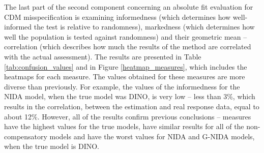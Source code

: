 \documentclass[english]{pwr_wmat_praca_dyplomowa}
\theoremstyle{plain}
\theoremstyle{definition}
\numberwithin{theorem}{chapter}
\begin{document}
The last part of the second component concerning an absolute ﬁt evaluation for CDM misspecification is examining informedness (which determines how well-informed the test is relative to randomness), markedness (which determines how well the population is tested against randomness) and their geometric mean -- correlation (which describes how much the results of the method are correlated with the actual assessment). The results are presented in Table \ref{tab:confusion_values} and in Figure \ref{heatmap_measures}, which includes the heatmaps for each measure. The values obtained for these measures are more diverse than previously. For example, the values of the informedness for the NIDA model, when the true model was DINO, is very low -- less than 3\%, which results in the correlation, between the estimation and real response data, equal to about 12\%. However, all of the results confirm previous conclusions -- measures have the highest values for the true models, have similar results for all of the non-compensatory models and have the worst values for NIDA and G-NIDA models, when the true model is DINO.
\end{document}

